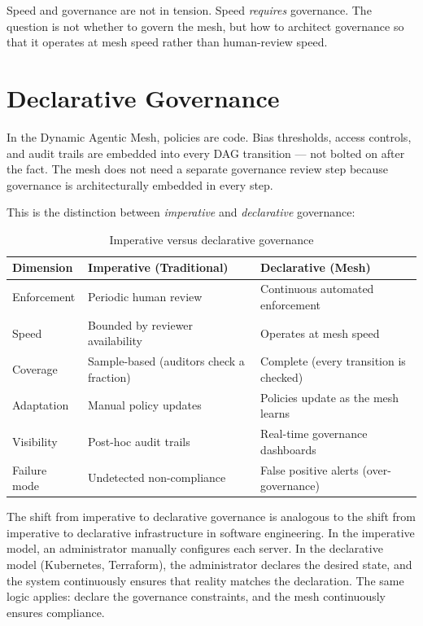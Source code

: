 \begin{keyinsight}
Speed and governance are not in tension. Speed \emph{requires} governance. The question is not whether to govern the mesh, but how to architect governance so that it operates at mesh speed rather than human-review speed.
\end{keyinsight}

\section{Declarative Governance}

In the Dynamic Agentic Mesh, policies are code. Bias thresholds, access controls, and audit trails are embedded into every DAG transition --- not bolted on after the fact. The mesh does not need a separate governance review step because governance is architecturally embedded in every step.

This is the distinction between \emph{imperative} and \emph{declarative} governance:

\begin{table}[h]
\centering
\caption{Imperative versus declarative governance}
\label{tab:governance-modes}
\begin{tabularx}{\textwidth}{l X X}
\toprule
\textbf{Dimension} & \textbf{Imperative (Traditional)} & \textbf{Declarative (Mesh)} \\
\midrule
Enforcement & Periodic human review & Continuous automated enforcement \\
\addlinespace
Speed & Bounded by reviewer availability & Operates at mesh speed \\
\addlinespace
Coverage & Sample-based (auditors check a fraction) & Complete (every transition is checked) \\
\addlinespace
Adaptation & Manual policy updates & Policies update as the mesh learns \\
\addlinespace
Visibility & Post-hoc audit trails & Real-time governance dashboards \\
\addlinespace
Failure mode & Undetected non-compliance & False positive alerts (over-governance) \\
\bottomrule
\end{tabularx}
\end{table}

The shift from imperative to declarative governance is analogous to the shift from imperative to declarative infrastructure in software engineering. In the imperative model, an administrator manually configures each server. In the declarative model (Kubernetes, Terraform), the administrator declares the desired state, and the system continuously ensures that reality matches the declaration. The same logic applies: declare the governance constraints, and the mesh continuously ensures compliance.

